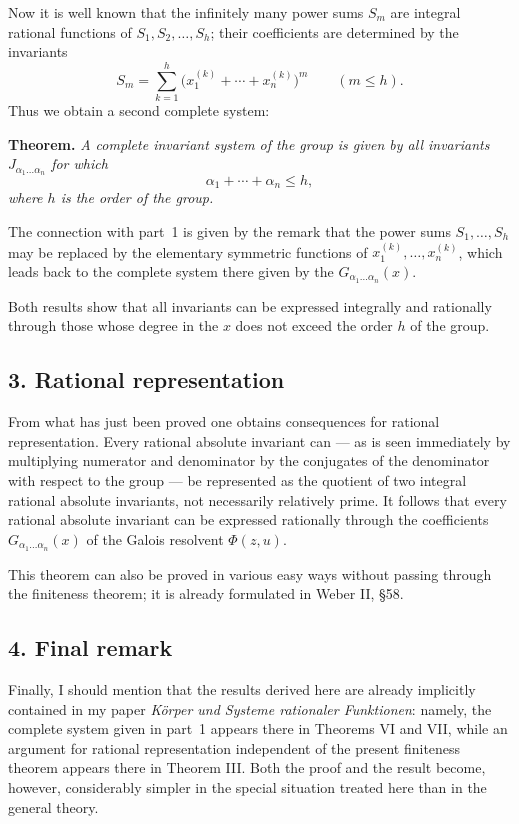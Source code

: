 \documentclass[11pt]{article}
\begin{document}
Now it is well known that the infinitely many power sums $S_m$ are integral rational functions of $S_1,S_2,\dots,S_h$; their coefficients are determined by the invariants
\[
S_m=\sum_{k=1}^h\bigl(x^{(k)}_1+\cdots+x^{(k)}_n\bigr)^m
\qquad (m\le h).
\]
Thus we obtain a second complete system:

\medskip
\noindent
\textbf{Theorem.}
\emph{A complete invariant system of the group is given by all invariants $J_{\alpha_1\dots\alpha_n}$ for which}
\[
\alpha_1+\cdots+\alpha_n\le h,
\]
\emph{where $h$ is the order of the group.}

The connection with part~1 is given by the remark that the power sums $S_1,\dots,S_h$ may be replaced by the elementary symmetric functions of $x^{(k)}_1,\dots,x^{(k)}_n$, which leads back to the complete system there given by the $G_{\alpha_1\dots\alpha_n}(x)$.

Both results show that all invariants can be expressed integrally and rationally through those whose degree in the $x$ does not exceed the order $h$ of the group.

\subsection*{3. Rational representation}

From what has just been proved one obtains consequences for rational representation. Every rational absolute invariant can --- as is seen immediately by multiplying numerator and denominator by the conjugates of the denominator with respect to the group --- be represented as the quotient of two integral rational absolute invariants, not necessarily relatively prime. It follows that every rational absolute invariant can be expressed rationally through the coefficients $G_{\alpha_1\dots\alpha_n}(x)$ of the Galois resolvent $\Phi(z,u)$.

This theorem can also be proved in various easy ways without passing through the finiteness theorem; it is already formulated in Weber II, \S 58.

\subsection*{4. Final remark}

Finally, I should mention that the results derived here are already implicitly contained in my paper \emph{Körper und Systeme rationaler Funktionen}: namely, the complete system given in part~1 appears there in Theorems VI and VII, while an argument for rational representation independent of the present finiteness theorem appears there in Theorem III. Both the proof and the result become, however, considerably simpler in the special situation treated here than in the general theory.
\end{document}
